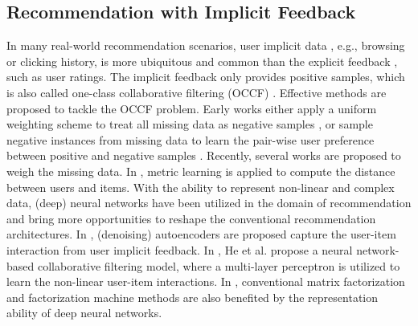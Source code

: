 \documentclass[sigconf]{acmart}
\begin{document}
\subsection{Recommendation with Implicit Feedback}
In many real-world recommendation scenarios, user implicit data \cite{DBLP:conf/kdd/WangWY15,DBLP:conf/cikm/TranLL018}, e.g., browsing or clicking history, is more ubiquitous and common than the explicit feedback \cite{DBLP:conf/www/SarwarKKR01,DBLP:conf/icml/SalakhutdinovMH07}, such as user ratings. The implicit feedback only provides positive samples, which is also called one-class collaborative filtering (OCCF) \cite{DBLP:conf/icdm/PanZCLLSY08}. Effective methods are proposed to tackle the OCCF problem. Early works either apply a uniform weighting scheme to treat all missing data as negative samples \cite{DBLP:conf/icdm/HuKV08}, or sample negative instances from missing data to learn the pair-wise user preference between positive and negative samples \cite{DBLP:conf/uai/RendleFGS09}. Recently, several works \cite{DBLP:conf/sigir/HeZKC16,DBLP:conf/www/LiangCMB16} are proposed to weigh the missing data. In \cite{DBLP:conf/www/TranLLK19,DBLP:conf/www/HsiehYCLBE17}, metric learning is applied to compute the distance between users and items. With the ability to represent non-linear and complex data, (deep) neural networks have been utilized in the domain of recommendation and bring more opportunities to reshape the conventional recommendation architectures. In \cite{DBLP:conf/wsdm/WuDZE16,DBLP:conf/cikm/MaZWL18,DBLP:conf/wsdm/MaKWWL19}, (denoising) autoencoders are proposed capture the user-item interaction from user implicit feedback. In \cite{DBLP:conf/www/HeLZNHC17}, He et al. propose a neural network-based collaborative filtering model, where a multi-layer perceptron is utilized to learn the non-linear user-item interactions. In \cite{DBLP:conf/ijcai/XueDZHC17,DBLP:conf/ijcai/GuoTYLH17,DBLP:conf/kdd/LianZZCXS18}, conventional matrix factorization and factorization machine methods are also benefited by the representation ability of deep neural networks.
\end{document}
